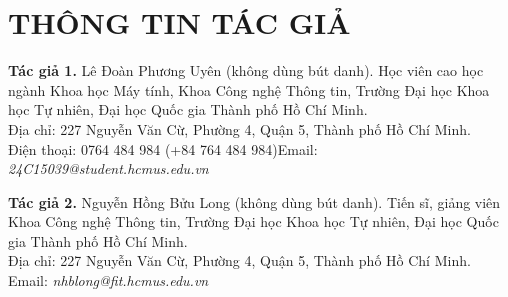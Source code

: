 \documentclass[12pt,a4paper,onecolumn]{article}
\newcommand{\ôvuông}[2]{\tikz[baseline=-0.45ex]{\draw[#1,line width=0.9pt,#2] (0,0) rectangle (0.34,0.18);}}
\begin{document}
{
\section*{THÔNG TIN TÁC GIẢ}
\setlength{\parindent}{0pt}

\noindent\textbf{Tác giả 1.} Lê Đoàn Phương Uyên (không dùng bút danh). Học viên cao học
ngành Khoa học Máy tính, Khoa Công nghệ Thông tin, Trường Đại học Khoa học Tự nhiên, Đại
học Quốc gia Thành phố Hồ Chí Minh.\\[2pt]
Địa chỉ: 227 Nguyễn Văn Cừ, Phường 4, Quận 5, Thành phố Hồ Chí Minh.\\
Điện thoại: 0764 484 984 (+84 764 484 984)\quad Email:
\textit{24C15039@student.hcmus.edu.vn}

\vspace{8pt}
\noindent\textbf{Tác giả 2.} Nguyễn Hồng Bửu Long (không dùng bút danh). Tiến sĩ, giảng
viên Khoa Công nghệ Thông tin, Trường Đại học Khoa học Tự nhiên, Đại học Quốc gia Thành
phố Hồ Chí Minh.\\[2pt]
Địa chỉ: 227 Nguyễn Văn Cừ, Phường 4, Quận 5, Thành phố Hồ Chí Minh.\\
Email: \textit{nhblong@fit.hcmus.edu.vn}
\par}
\end{document}
